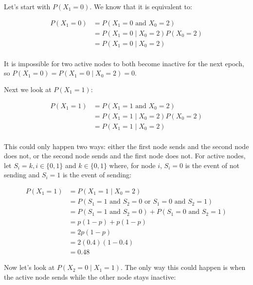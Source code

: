\documentclass{amsart}
\theoremstyle{definition} %
\begin{document}
Let's start with $P(X_1 = 0)$. We know that it is equivalent to:

\begin{equation}
  \begin{aligned}
    P(X_1 = 0) &= P(X_1 = 0 \text{ and } X_0 = 2) \\
    &= P(X_1 = 0 \mid X_0 = 2)P(X_0 = 2) \\
    &= P(X_1 = 0 \mid X_0 = 2) \\
  \end{aligned}
\end{equation}

It is impossible for two active nodes to both become inactive for the next
epoch, so $P(X_1 = 0) = P(X_1 = 0 \mid X_0 = 2) = 0$.

Next we look at $P(X_1 = 1)$:

\begin{equation}
  \begin{aligned}
    P(X_1 = 1) &= P(X_1 = 1 \text{ and } X_0 = 2) \\
    &= P(X_1 = 1 \mid X_0 = 2)P(X_0 = 2) \\
    &= P(X_1 = 1 \mid X_0 = 2) \\
  \end{aligned}
\end{equation}

This could only happen two ways: either the first node sends and the second
node does not, or the second node sends and the first node does not. For active
nodes, let $S_i=k, i \in \{0,1\}$ and $k \in \{0,1\}$ where, for node $i$,
$S_i=0$ is the event of not sending and $S_i=1$ is the event of sending:

\begin{equation}
  \begin{aligned}
    P(X_1 = 1) &= P(X_1 = 1 \mid X_0 = 2) \\
    &= P(S_1 = 1 \text{ and } S_2 = 0 \text{ or } S_1 = 0 \text{ and } S_2 = 1) \\
    &= P(S_1 = 1 \text{ and } S_2 = 0) + P(S_1 = 0 \text{ and } S_2 = 1) \\
    &= p(1-p) + p(1-p) \\
    &= 2p(1-p) \\
    &= 2(0.4)(1-0.4) \\
    &= 0.48
  \end{aligned}
\end{equation}

Now let's look at $P(X_2=0 \mid X_1=1)$. The only way this could happen is when
the active node sends while the other node stays inactive:
\end{document}
